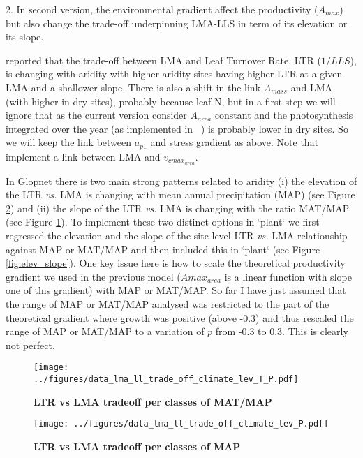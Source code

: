 \documentclass[a4paper,11pt]{article}
\begin{document}
\clearpage

2. In second version, the environmental gradient affect the productivity ($A_{max}$) but also change the trade-off underpinning LMA-LLS in term of its elevation or its slope.

\citet{Wright-2005} reported that the trade-off between LMA and Leaf Turnover Rate, LTR ($1/LLS$), is changing with aridity with higher aridity sites having higher LTR at a given LMA and a shallower slope. There is also a shift in the link $A_{mass}$ and LMA (with higher in dry sites), probably because leaf N, but in a first step we will ignore that as the current version consider $A_{area}$ constant and the photosynthesis integrated over the year (as implemented in \plant\ ) is probably lower in dry sites. So we will keep the link between $a_{p1}$ and stress gradient as above. Note that \citet{Sakschewski-2015} implement a link between LMA and $v_{cmax_{area}}$.

In Glopnet there is two main strong patterns related to aridity (i) the elevation of the LTR \textit{vs.} LMA is changing with mean annual precipitation (MAP) (see Figure \ref{fig:MAP}) and (ii) the slope of the LTR \textit{vs.} LMA is changing with the ratio MAT/MAP (see Figure \ref{fig:MAT_MAP}). To implement these two distinct options in `plant` we first regressed the elevation and the slope of the site level LTR \textit{vs.} LMA relationship against MAP or MAT/MAP and then included this in `plant` (see Figure \ref{fig:elev_slope}). One key issue here is how to scale the theoretical productivity gradient we used in the previous model ($A{max}_{area}$ is a linear function with slope one of this gradient) with MAP or MAT/MAP. So far I have just assumed that the range of MAP or MAT/MAP analysed was restricted to the part of the theoretical gradient where growth was positive (above -0.3) and thus rescaled the range of MAP or MAT/MAP to a variation of $p$ from -0.3 to 0.3. This is clearly not perfect.


\begin{figure}[ht]
\centering
\texttt{[image: ../figures/data\_lma\_ll\_trade\_off\_climate\_lev\_T\_P.pdf]}
\caption{\textbf{LTR vs LMA tradeoff per classes of MAT/MAP}
\label{fig:MAT_MAP}}
\end{figure}


\begin{figure}[ht]
\centering
\texttt{[image: ../figures/data\_lma\_ll\_trade\_off\_climate\_lev\_P.pdf]}
\caption{\textbf{LTR vs LMA tradeoff per classes of MAP}
\label{fig:MAP}}
\end{figure}
\end{document}
